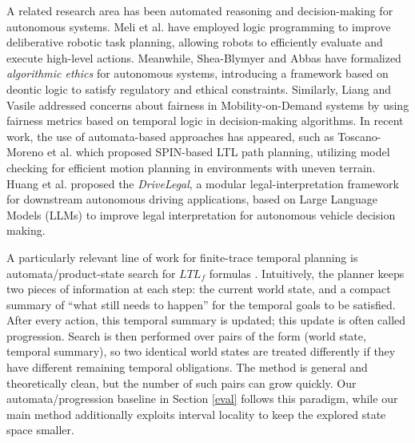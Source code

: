 \documentclass[a4paper,fleqn]{cas-dc}
\begin{document}
A related research area has been automated reasoning and decision-making for autonomous systems. Meli et al. \cite{melilogic} have employed logic programming to improve deliberative robotic task planning, allowing robots to efficiently evaluate and execute high-level actions.
Meanwhile, Shea-Blymyer and Abbas \cite{10.1145/3460975} have formalized {\it algorithmic ethics} for autonomous systems, introducing a framework based on deontic logic \cite{von1951deontic} to satisfy regulatory and ethical constraints. Similarly, 
 Liang and Vasile \cite{fairplanning} addressed concerns about fairness in Mobility-on-Demand systems by using fairness metrics based on temporal logic in decision-making algorithms.
In recent work, the use of automata-based approaches has appeared, such as Toscano-Moreno et al. \cite{li2024spin} which proposed SPIN-based LTL path planning, utilizing model checking for efficient motion planning in environments with uneven terrain. Huang et al. \cite{HUANG2026131593} proposed the \emph{DriveLegal}, a modular legal-interpretation framework for downstream autonomous driving applications, based on Large Language Models (LLMs) to improve legal interpretation for autonomous vehicle decision making.

A particularly relevant line of work for finite-trace temporal planning is automata/product-state search for $LTL_f$ formulas \cite{degiacomo2013ltlf,camacho2018finite}. Intuitively, the planner keeps two pieces of information at each step: the current world state, and a compact summary of ``what still needs to happen'' for the temporal goals to be satisfied. After every action, this temporal summary is updated; this update is often called progression. Search is then performed over pairs of the form (world state, temporal summary), so two identical world states are treated differently if they have different remaining temporal obligations. The method is general and theoretically clean, but the number of such pairs can grow quickly. Our automata/progression baseline in Section \ref{eval} follows this paradigm, while our main method additionally exploits interval locality to keep the explored state space smaller.
\end{document}

